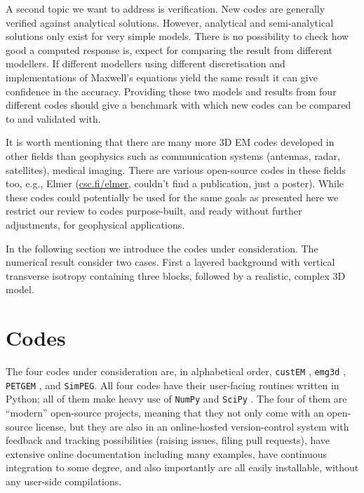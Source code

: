 \documentclass[
    paper,
  ]{geophysics}
\newcommand{\emg}[2]{\texttt{emg#1#2}\xspace}
\newcommand{\simpeg}{\texttt{SimPEG}\xspace}
\newcommand{\custem}{\texttt{custEM}\xspace}
\newcommand{\petgem}{\texttt{PETGEM}\xspace}
\begin{document}
A second topic we want to address is verification. New codes are generally
verified against analytical solutions. However, analytical and semi-analytical
solutions only exist for very simple models. There is no possibility to check
how good a computed response is, expect for comparing the result from different
modellers. If different modellers using different discretisation and
implementations of Maxwell's equations yield the same result it can give
confidence in the accuracy. Providing these two models and results from four
different codes should give a benchmark with which new codes can be compared to
and validated with.

It is worth mentioning that there are many more 3D EM codes developed in other
fields than geophysics such as communication systems (antennas, radar,
satellites), medical imaging. There are various open-source codes in these
fields  too, e.g., Elmer
(\href{http://www.csc.fi/elmer}{csc.fi/elmer}, couldn't find a publication,
just a poster). While these codes could potentially be used for the same goals
as presented here we restrict our review to codes purpose-built, and ready
without further adjustments, for geophysical applications.

In the following section we introduce the codes under consideration. The
numerical result consider two cases. First a layered background with vertical
transverse isotropy containing three blocks, followed by a realistic, complex
3D model.

\clearpage  %
\section{Codes}

The four codes under consideration are, in alphabetical order, \custem
\citep{GEO.19.Rochlitz}, \emg3d \citep{JOSS.19.Werthmuller}, \petgem
\citep{GJI.19.CastilloReyes}, and \simpeg \citep{CAG.15.Cockett}. All four
codes have their user-facing routines written in Python; all of them make heavy
use of \texttt{NumPy} \citep{CSE.11.VanDerWalt} and \texttt{SciPy}
\citep{NM.20.Virtanen}. The four of them are “modern” open-source projects,
meaning that they not only come with an open-source license, but they are also
in an online-hosted version-control system with feedback and tracking
possibilities (raising issues, filing pull requests), have extensive online
documentation including many examples, have continuous integration to some
degree, and also importantly are all easily installable, without any user-side
compilations.
\end{document}
